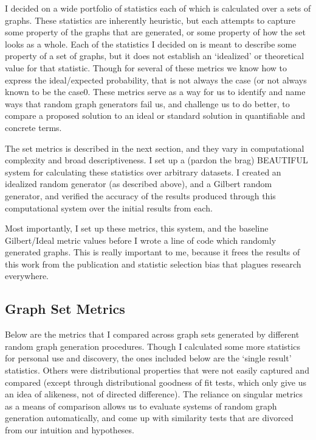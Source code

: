 I decided on a wide portfolio of statistics each of which is calculated over a sets of graphs.
These statistics are inherently heuristic, but each attempts to capture some property of the graphs that are generated, or some property of how the set looks as a whole.
Each of the statistics I decided on is meant to describe some property of a set of graphs, but it does not establish an `idealized' or theoretical value for that statistic.
Though for several of these metrics we know how to express the ideal/expected probability, that is not always the case (or not always known to be the case0.
These metrics serve as a way for us to identify and name ways that random graph generators fail us, and challenge us to do better, to compare a proposed solution to an ideal or standard solution in quantifiable and concrete terms.

The set metrics is described in the next section, and they vary in computational complexity and broad descriptiveness.
I set up a (pardon the brag) BEAUTIFUL system for calculating these statistics over arbitrary datasets.
I created an idealized random generator (as described above), and a Gilbert random generator, and verified the accuracy of the results produced through this computational system over the initial results from each.

Most importantly, I set up these metrics, this system, and the baseline Gilbert/Ideal metric values before I wrote a line of code which randomly generated graphs.
This is really important to me, because it frees the results of this work from the publication and statistic selection bias that plagues research everywhere.

\subsection{Graph Set Metrics}
Below are the metrics that I compared across graph sets generated by different random graph generation procedures.
Though I calculated some more statistics for personal use and discovery, the ones included below are the `single result' statistics.
Others were distributional properties that were not easily captured and compared (except through distributional goodness of fit tests, which only give us an idea of alikeness, not of directed difference).
The reliance on singular metrics as a means of comparison allows us to evaluate systems of random graph generation automatically, and come up with similarity tests that are divorced from our intuition and hypotheses.

